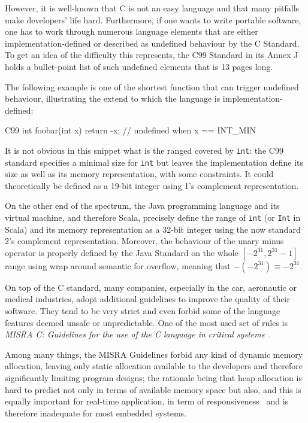 \documentclass[a4paper,twoside]{article}
\newcommand{\InlineC}[1]{\lstinline[language=C99]|#1|}
\newcommand{\InlineS}[1]{\lstinline[language=Leon]|#1|}
\begin{document}
However, it is well-known that C is not an easy language and that many pitfalls
make developers' life hard. Furthermore, if one wants to write portable
software, one has to work through numerous language elements that are either
implementation-defined or described as undefined behaviour by the C Standard. To
get an idea of the difficulty this represents, the C99 Standard \cite{c99} in
its Annex J holds a bullet-point list of such undefined elements that is 13
pages long.

The following example is one of the shortest function that can trigger undefined
behaviour, illustrating the extend to which the language is
implementation-defined:

\begin{ShortCode}{C99}
int foobar(int x) { return -x; } // undefined when x == INT_MIN
\end{ShortCode}

It is not obvious in this snippet what is the ranged covered by \InlineC{int}:
the C99 standard specifies a minimal size for \InlineC{int} but leaves the
implementation define its size as well as its memory representation, with some
constraints. It could theoretically be defined as a 19-bit integer using 1's
complement representation.

On the other end of the spectrum, the Java programming language and its virtual
machine, and therefore Scala, precisely define the range of \InlineC{int} (or
\InlineS{Int} in Scala) and its memory representation as a 32-bit integer using
the now standard 2's complement representation. Moreover, the behaviour of the
unary minus operator is properly defined by the Java Standard \cite{java8} on
the whole $[-2^{31}, 2^{31}-1]$ range using wrap around semantic for overflow,
meaning that $-(-2^{31}) \equiv -2^{31}$.

On top of the C standard, many companies, especially in the car, aeronautic or
medical industries, adopt additional guidelines to improve the quality of their
software. They tend to be very strict and even forbid some of the language
features deemed unsafe or unpredictable. One of the most used set of rules is
\emph{MISRA C: Guidelines for the use of the C language in critical
systems}~\cite{misra}.

Among many things, the MISRA Guidelines forbid any kind of dynamic memory
allocation, leaving only static allocation available to the developers and
therefore significantly limiting program designs; the rationale being that heap
allocation is hard to predict not only in terms of available memory space but
also, and this is equally important for real-time application, in term of
responsiveness~\cite{gross} and is therefore inadequate for most embedded
systems.
\end{document}
